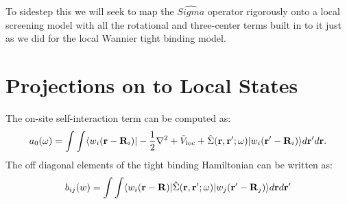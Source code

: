 To sidestep this we will seek to map the $\hat{Sigma}$ operator 
rigorously onto a local screening model with all the rotational and
three-center terms built in to it just as we did for the local Wannier 
tight binding model.

\section{Projections on to Local States}
The on-site self-interaction term can be computed as:
%
\begin{equation}
a_{0}(\omega) = \int\int\langle w_{i}({\bf r}-{\bf R}_{i})|-\frac{1}{2}\nabla^{2} + \tilde{V}_{\rm loc} + \hat{\Sigma}({\bf r},{\bf r}';\omega)|w_{i}({\bf r}'-{\bf R}_{i})\rangle d{\bf r}'d{\bf r}.
\end{equation}
%
The off diagonal elements of the tight binding Hamiltonian can be written as:
%
\begin{equation}
b_{ij}(w) = \int\int\langle w_{i}({\bf r}-{\bf R})|\hat{\Sigma}({\bf r},{\bf r}';\omega)|w_{j}({\bf r}'-{\bf R}_{j})\rangle d{\bf r} d{\bf r}'
\end{equation}
